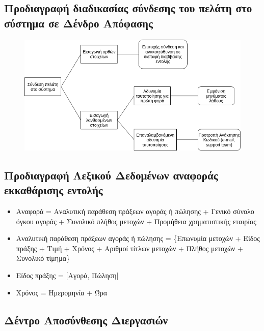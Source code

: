 \documentclass{article}
\begin{document}
\subsection{Προδιαγραφή διαδικασίας σύνδεσης του πελάτη στο σύστημα σε Δένδρο Απόφασης}
\begin{figure}[!h]
	\includegraphics[width=\linewidth]{../Structured_Analysis/Decision_Tree.png}
\end{figure}

\subsection{Προδιαγραφή Λεξικού Δεδομένων αναφοράς εκκαθάρισης εντολής}
\begin{itemize}
\item Αναφορά = Αναλυτική παράθεση πράξεων αγοράς ή πώλησης + Γενικό σύνολο όγκου αγοράς + 
Συνολικό πλήθος μετοχών + Προμήθεια χρηματιστικής εταιρίας
\item Αναλυτική παράθεση πράξεων αγοράς ή πώλησης = \{Επωνυμία μετοχών + Είδος πράξης + Τιμή
 + Χρόνος + Αριθμοί τίτλων μετοχών + Πλήθος μετοχών + Συνολικό τίμημα\}
\item Είδος πράξης = [Αγορά, Πώληση]
\item Χρόνος = Ημερομηνία + Ώρα
\end{itemize}

\newpage

\subsection{Δέντρο Αποσύνθεσης Διεργασιών}
\end{document}

